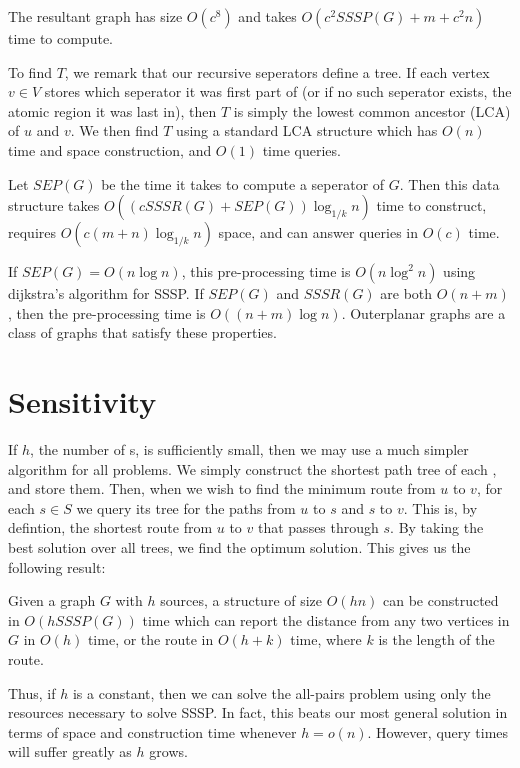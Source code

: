 \documentclass{cccg13}
\begin{document}
The resultant graph has size $O(c^8)$ and takes $O(c^2SSSP(G) + m + c^2n)$ time to compute.

To find $T$, we remark that our recursive seperators define a tree. If each vertex $v \in V$ stores which seperator it was first part of (or if no such seperator exists, the atomic region it was last in), then $T$ is simply the lowest common ancestor (LCA) of $u$ and $v$. We then find $T$ using a standard LCA structure which has $O(n)$ time and space construction, and $O(1)$ time queries. 

Let $SEP(G)$ be the time it takes to compute a seperator of $G$. Then this data structure takes $O((cSSSR(G) + SEP(G))\log_{1/k}n)$ time to construct, requires $O(c(m + n)\log_{1/k}n)$ space, and can answer queries in $O(c)$ time.

If $SEP(G) = O(n \log n)$, this pre-processing time is $O(n \log^2 n)$ using dijkstra's algorithm for SSSP. If $SEP(G)$ and $SSSR(G)$ are both $O(n + m)$, then the pre-processing time is $O((n + m) \log n)$. Outerplanar graphs are a class of graphs that satisfy these properties.





\section{\Supplier{} Sensitivity}
If $h$, the number of \supplier{}s, is sufficiently small, then we may use a much simpler algorithm for all \supplier{} problems. We simply construct the shortest path tree of each \supplier{}, and store them. Then, when we wish to find the minimum \supplied{} route from $u$ to $v$, for each \supplier{} $s \in S$ we query its tree for the paths from $u$ to $s$ and $s$ to $v$. This is, by defintion, the shortest route from $u$ to $v$ that passes through $s$. By taking the best solution over all trees, we find the optimum solution. This gives us the following result:

\begin{theorem}
    Given a graph $G$ with $h$ sources, a structure of size $O(hn)$ can be constructed in $O(h SSSP(G))$ time which can report the \supplied{} distance from any two vertices in $G$ in $O(h)$ time, or the \supplied{} route in $O(h + k)$ time, where $k$ is the length of the route.
\end{theorem}

Thus, if $h$ is a constant, then we can solve the all-pairs problem using only the resources necessary to solve SSSP. In fact, this beats our most general solution in terms of space and construction time whenever $h = o(n)$. However, query times will suffer greatly as $h$ grows.
\end{document}
